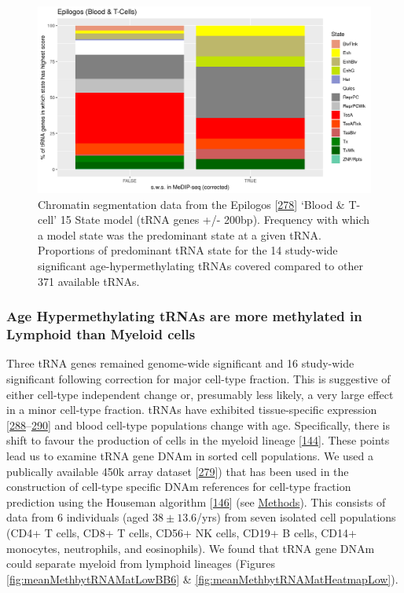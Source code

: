 \documentclass[
]{book}
\begin{document}
\begin{figure}

{\centering \includegraphics[width=0.9\linewidth]{./figs/maxScoreBytRNAtRNAge6SplitPlot_BL} 

}

\caption{Chromatin segmentation data from the Epilogos {[}\protect\hyperlink{ref-Meuleman2019}{278}{]} `Blood \& T-cell' 15 State model (tRNA genes +/- 200bp). Frequency with which a model state was the predominant state at a given tRNA. Proportions of predominant tRNA state for the 14 study-wide significant age-hypermethylating tRNAs covered compared to other 371 available tRNAs.}\label{fig:combinedEpilogosPlot}
\end{figure}



\hypertarget{age-hypermethylating-trnas-are-more-methylated-in-lymphoid-than-myeloid-cells}{%
\subsubsection{Age Hypermethylating tRNAs are more methylated in Lymphoid than Myeloid cells}\label{age-hypermethylating-trnas-are-more-methylated-in-lymphoid-than-myeloid-cells}}

Three tRNA genes remained genome-wide significant and 16 study-wide significant following correction for major cell-type fraction.
This is suggestive of either cell-type independent change or, presumably less likely, a very large effect in a minor cell-type fraction.
tRNAs have exhibited tissue-specific expression {[}\protect\hyperlink{ref-Schmitt2014b}{288}--\protect\hyperlink{ref-Sagi2016}{290}{]} and blood cell-type populations change with age.
Specifically, there is shift to favour the production of cells in the myeloid lineage {[}\protect\hyperlink{ref-Geiger2013}{144}{]}.
These points lead us to examine tRNA gene DNAm in sorted cell populations.
We used a publically available 450k array dataset {[}\protect\hyperlink{ref-Reinius2012}{279}{]}) that has been used in the construction of cell-type specific DNAm references for cell-type fraction prediction using the Houseman algorithm {[}\protect\hyperlink{ref-Houseman2012}{146}{]} (see \protect\hyperlink{sortedbloodmethods}{Methods}).
This consists of data from 6 individuals (aged \(38 \pm 13.6\)/yrs) from seven isolated cell populations (CD4+ T cells, CD8+ T cells, CD56+ NK cells, CD19+ B cells, CD14+ monocytes, neutrophils, and eosinophils).
We found that tRNA gene DNAm could separate myeloid from lymphoid lineages (Figures \ref{fig:meanMethbytRNAMatLowBB6} \& \ref{fig:meanMethbytRNAMatHeatmapLow}).
\end{document}
